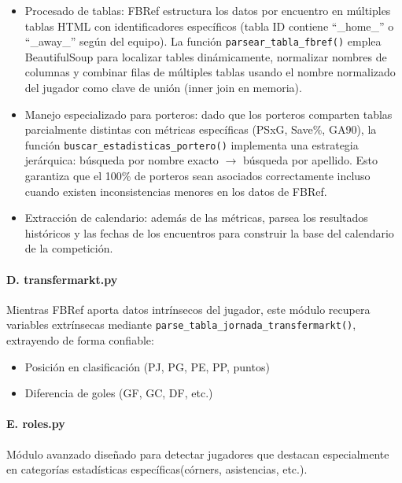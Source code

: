 \begin{itemize}
\item Procesado de tablas: FBRef estructura los datos por encuentro en múltiples tablas HTML con identificadores específicos (tabla ID contiene ``\_home\_'' o ``\_away\_'' según del equipo). La función \texttt{parsear\_tabla\_fbref()} emplea BeautifulSoup para localizar tables dinámicamente, normalizar nombres de columnas y combinar filas de múltiples tablas usando el nombre normalizado del jugador como clave de unión (inner join en memoria).

\item Manejo especializado para porteros: dado que los porteros comparten tablas parcialmente distintas con métricas específicas (PSxG, Save\%, GA90), la función \texttt{buscar\_estadisticas\_portero()} implementa una estrategia jerárquica: búsqueda por nombre exacto $\rightarrow$ búsqueda por apellido. Esto garantiza que el 100\% de porteros sean asociados correctamente incluso cuando existen inconsistencias menores en los datos de FBRef.

\item Extracción de calendario: además de las métricas, parsea los resultados históricos y las fechas de los encuentros para construir la base del calendario de la competición.
\end{itemize}

\paragraph{D. transfermarkt.py}

Mientras FBRef aporta datos intrínsecos del jugador, este módulo recupera variables extrínsecas mediante \texttt{parse\_tabla\_jornada\_transfermarkt()}, extrayendo de forma confiable:

\begin{itemize}
\item Posición en clasificación (PJ, PG, PE, PP, puntos)
\item Diferencia de goles (GF, GC, DF, etc.)
\end{itemize}

\paragraph{E. roles.py}

Módulo avanzado diseñado para detectar jugadores que destacan especialmente en categorías estadísticas específicas(córners, asistencias, etc.).

